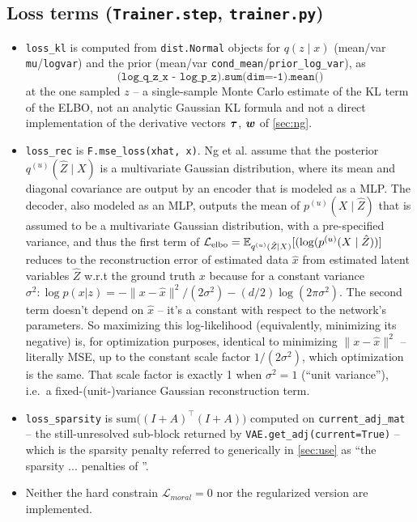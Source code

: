 \subsection{Loss terms (\texttt{Trainer.step}, \texttt{trainer.py})}
\label{app:code:lossterms}
\begin{itemize}
\item \texttt{loss\_kl} is computed from \texttt{dist.Normal} objects for $q(z\mid x)$ (mean/var
\texttt{mu}/\texttt{logvar}) and the prior (mean/var \texttt{cond\_mean}/\texttt{prior\_log\_var}), 
as
$$
\texttt{(log\_q\_z\_x - log\_p\_z).sum(dim=-1).mean()}
$$
at the one sampled $z$ -- a single-sample Monte 
Carlo estimate of the KL term of the ELBO, not an analytic Gaussian KL formula and not a direct 
implementation of the derivative vectors $\boldsymbol{\tau}$, $\boldsymbol{w}$ of \cref{sec:ng}.
\item \texttt{loss\_rec} is \texttt{F.mse\_loss(xhat, x)}. Ng et al. assume that  
the posterior $q^{(u)}(\hat Z \mid X)$ is a multivariate Gaussian distribution, where its mean and 
diagonal covariance are output by an encoder that is modeled as a MLP. The decoder, also modeled as an 
MLP, outputs the mean of $p^{(u)}(X \mid \hat Z)$ that is assumed to be a multivariate Gaussian 
distribution, with a pre-specified variance, and thus the first term of 
$\mathcal{L}_{\mathrm{elbo}} = \mathbb{E}_{q^{(u)}(\hat Z \mid X)}[(\log(p^{(u)}(X \mid \hat Z))]$ reduces to 
the reconstruction error of estimated data $\hat x$ from estimated latent variables  $\hat Z$ 
w.r.t the ground truth $x$ because for a constant variance $\sigma^2: \log p(x|z) = -\lVert x - 
\hat x\rVert^2 / (2\sigma^2) - (d/2)\log(2\pi\sigma^2)$. 
The second term doesn't depend on $\hat x$ -- it's a constant 
with respect to the network's parameters. So maximizing this log-likelihood (equivalently, minimizing 
its negative) is, for optimization purposes, identical to minimizing $\lVert x - \hat x\rVert^2$ -- 
literally MSE, up to the constant scale factor $1/(2\sigma^2)$, which optimization is the same. That 
scale factor is exactly 1 when $\sigma^2=1$ (``unit variance''), i.e.\ a fixed-(unit-)variance Gaussian 
reconstruction term.
\item \texttt{loss\_sparsity} is $\mathrm{sum}\bigl((I+A)^\top(I+A)\bigr)$ computed on
\texttt{current\_adj\_mat} -- the still-unresolved sub-block returned by 
\texttt{VAE.get\_adj(current=True)}
-- which is the sparsity penalty referred to generically in \cref{sec:use} as ``the sparsity ... 
penalties of \cite{ng2025}''.
\item Neither the hard constrain $\mathcal{L}_{moral} = 0$ nor the regularized version are 
implemented.


\end{itemize}
